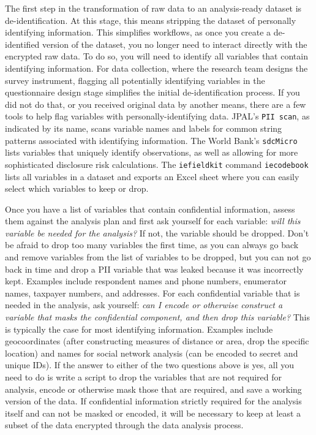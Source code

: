 The first step in the transformation of raw data to an analysis-ready dataset is de-identification.
At this stage, this means stripping the dataset of personally identifying information.
This simplifies workflows, as once you create a de-identified version of the dataset,
you no longer need to interact directly with the encrypted raw data.
To do so, you will need to identify all variables that contain
identifying information.
For data collection, where the research team designs the survey instrument,
flagging all potentially identifying variables in the questionnaire design stage
simplifies the initial de-identification process.
If you did not do that, or you received original data by another means,
there are a few tools to help flag variables with personally-identifying data.
JPAL's \texttt{PII scan}, as indicated by its name,
scans variable names and labels for common string patterns associated with identifying information.
The World Bank's \texttt{sdcMicro}
lists variables that uniquely identify observations,
as well as allowing for more sophisticated disclosure risk calculations.
The \texttt{iefieldkit} command \texttt{iecodebook}
lists all variables in a dataset and exports an Excel sheet
where you can easily select which variables to keep or drop.

Once you have a list of variables that contain confidential information,
assess them against the analysis plan and first ask yourself for each variable:
\textit{will this variable be needed for the analysis?}
If not, the variable should be dropped.
Don't be afraid to drop too many variables the first time,
as you can always go back and remove variables from the list of variables to be dropped,
but you can not go back in time and drop a PII variable that was leaked
because it was incorrectly kept.
Examples include respondent names and phone numbers, enumerator names, taxpayer 
numbers, and addresses.
For each confidential variable that is needed in the analysis, ask yourself:
\textit{can I encode or otherwise construct a variable that masks the confidential component, and
then drop this variable?}
This is typically the case for most identifying information.
Examples include geocoordinates
(after constructing measures of distance or area,
drop the specific location)
and names for social network analysis (can be encoded to secret and unique IDs).
If the answer to either of the two questions above is yes,
all you need to do is write a script to drop the variables that are not required for analysis,
encode or otherwise mask those that are required,
and save a working version of the data.
If confidential information strictly required for the analysis itself and can not be
masked or encoded,
it will be necessary to keep at least a subset of the data encrypted through
the data analysis process.

